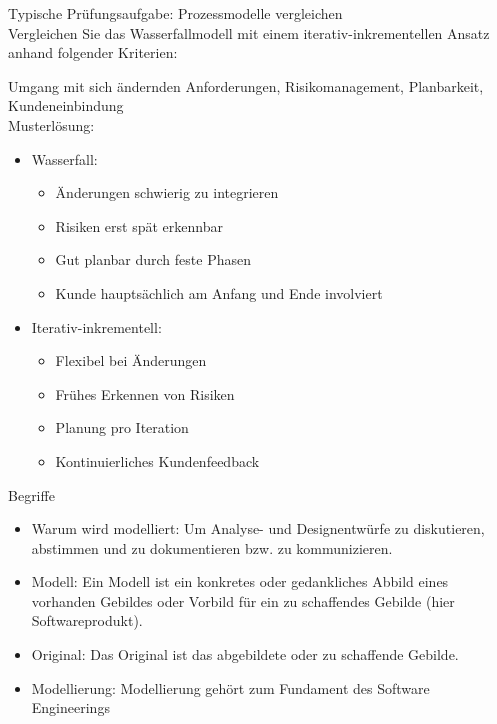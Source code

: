 \begin{example2}{Typische Prüfungsaufgabe: Prozessmodelle vergleichen}\\
    \small
Vergleichen Sie das Wasserfallmodell mit einem iterativ-inkrementellen Ansatz anhand folgender Kriterien:

Umgang mit sich ändernden Anforderungen, Risikomanagement, Planbarkeit, Kundeneinbindung
\vspace{1mm}\\
Musterlösung:
\begin{itemize}
    \item Wasserfall:
    \begin{itemize}
        \item Änderungen schwierig zu integrieren
        \item Risiken erst spät erkennbar
        \item Gut planbar durch feste Phasen
        \item Kunde hauptsächlich am Anfang und Ende involviert
    \end{itemize}
    \item Iterativ-inkrementell:
    \begin{itemize}
        \item Flexibel bei Änderungen
        \item Frühes Erkennen von Risiken
        \item Planung pro Iteration
        \item Kontinuierliches Kundenfeedback
    \end{itemize}
\end{itemize}
\end{example2}

\begin{definition}{Begriffe}
  \begin{itemize}
    \item Warum wird modelliert: Um Analyse- und Designentwürfe zu diskutieren, abstimmen und zu dokumentieren bzw. zu kommunizieren.
    \item Modell: Ein Modell ist ein konkretes oder gedankliches Abbild eines vorhanden Gebildes oder Vorbild für ein zu schaffendes Gebilde (hier Softwareprodukt).
    \item Original: Das Original ist das abgebildete oder zu schaffende Gebilde.
    \item Modellierung: Modellierung gehört zum Fundament des Software Engineerings
  \end{itemize}
\end{definition}

